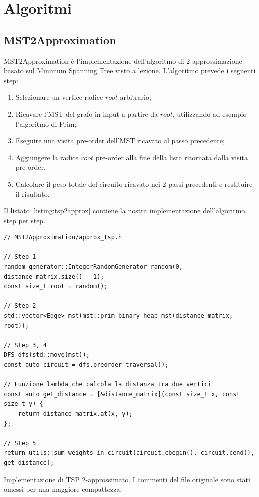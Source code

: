 
\section{Algoritmi}
\label{cap:algorithms}

\subsection{MST2Approximation}

MST2Approximation è l'implementazione dell'algoritmo di $2$-approssimazione basato sul Minimum Spanning Tree visto a lezione. L'algoritmo prevede i seguenti step:

\begin{enumerate}
    \item Selezionare un vertice radice $root$ arbitrario;
    \item Ricavare l'MST del grafo in input a partire da $root$, utilizzando ad esempio l'algoritmo di Prim;
    \item Eseguire una visita pre-order dell'MST ricavato al passo precedente;
    \item Aggiungere la radice $root$ pre-order alla fine della lista ritornata dalla visita pre-order.
    \item Calcolare il peso totale del circuito ricavato nei 2 passi precedenti e restituire il risultato.
\end{enumerate}

\noindent Il listato \ref{listing:tsp2approx} contiene la nostra implementazione dell'algoritmo, step per step.\\

\begin{listing}[!ht]
\begin{verbatim}
// MST2Approximation/approx_tsp.h

// Step 1
random_generator::IntegerRandomGenerator random(0, distance_matrix.size() - 1);
const size_t root = random();

// Step 2
std::vector<Edge> mst(mst::prim_binary_heap_mst(distance_matrix, root));

// Step 3, 4
DFS dfs(std::move(mst));
const auto circuit = dfs.preorder_traversal();

// Funzione lambda che calcola la distanza tra due vertici
const auto get_distance = [&distance_matrix](const size_t x, const size_t y) {
    return distance_matrix.at(x, y);
};

// Step 5
return utils::sum_weights_in_circuit(circuit.cbegin(), circuit.cend(), get_distance);
\end{verbatim}
\caption{Implementazione di TSP 2-approssimato. I commenti del file originale sono stati omessi per una maggiore compattezza.}
\label{listing:tsp2approx}
\end{listing}

